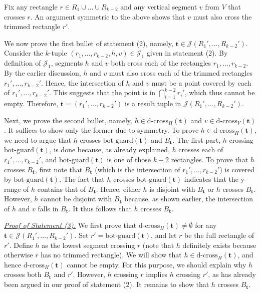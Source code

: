 \documentclass[sigconf]{acmart}
\def\vgap{\vspace{0mm}}
\def\J{\mathcal{J}}
\def\gbot{\mathrm{bot\text{-}guard}}
\def\dcross{\mathrm{d\text{-}cross}}
\begin{document}
{{{\vgap

Fix any rectangle $r \in R_1 \cup ... \cup R_{k-2}$ and any vertical segment $v$ from $V$ that crosses $r$. An argument symmetric to the above shows that $v$ must also cross the trimmed rectangle $r'$.

\vgap

We now prove the first bullet of statement (2), namely, $\bm{t}\in \J(R_1',...,R_{k-2}')$. Consider the $k$-tuple $(r_1,...,r_{k-2},h,v)\in \J_1$ given in statement (2). By definition of $\J_1$, segments $h$ and $v$ both cross each of the rectangles $r_1,..., r_{k-2}$. By the earlier discussion, $h$ and $v$ must also cross each of the trimmed rectangles $r_1',..., r_{k-2}'$. Hence, the intersection of $h$ and $v$ must be a point covered by each of $r_1',..., r_{k-2}'$. This suggests that the point is in $\bigcap_{i = 1}^{k-2}r_i'$, which thus cannot be empty. Therefore, $\bm{t} = (r_1', ..., r_{k-2}')$ is a result tuple in $\J(R_1',...,R_{k-2}')$. 

\vgap 

Next, we prove the second bullet, namely, $h \in \dcross_H(\bm{t})$ and $v \in \dcross_V(\bm{t})$. It suffices to show only the former due to symmetry. To prove $h \in \dcross_H(\bm{t})$, we need to argue that $h$ crosses $\gbot(\bm{t})$ and $B_\bm{t}$. The first part, $h$ crossing $\gbot(\bm{t})$, is done because, as already explained, $h$ crosses each of $r_1', ..., r_{k-2}'$, and $\gbot(\bm{t})$ is one of those $k-2$ rectangles. To prove that $h$ crosses $B_\bm{t}$, first note that $B_\bm{t}$ (which is the intersection of $r_1', ..., r_{k-2}'$) is covered by $\gbot(\bm{t})$. The fact that $h$ crosses $\gbot(\bm{t})$ indicates that the y-range of $h$ contains that of $B_\bm{t}$. Hence, either $h$ is disjoint with $B_\bm{t}$ or $h$ crosses $B_\bm{t}$. However, $h$ cannot be disjoint with $B_\bm{t}$ because, as shown earlier, the intersection of $h$ and $v$ falls in $B_\bm{t}$. It thus follows that $h$ crosses $B_\bm{t}$.

\vgap 

\noindent \underline{\em Proof of Statement (3).} We first prove that $\dcross_H(\bm{t}) \neq \emptyset$ for any $\bm{t} \in \J(R_1',...,R_{k-2}')$. Set $r' = \gbot(\bm{t})$, and let $r$ be the full rectangle of $r'$. Define $h$ as the lowest segment crossing $r$ (note that $h$ definitely exists because otherwise $r$ has no trimmed rectangle). We will show that $h \in \dcross_H(\bm{t})$, and hence $\dcross_H(\bm{t})$ cannot be empty. For this purpose, we should explain why $h$ crosses both $B_{\bm{t}}$ and $r'$. However, $h$ crossing $r$ implies $h$ crossing $r'$, as has already been argued in our proof of statement (2). It remains to show that $h$ crosses $B_\bm{t}$.

}}}
\end{document}
